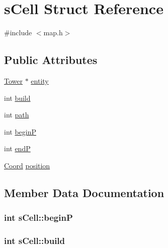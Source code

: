 \hypertarget{structs_cell}{}\section{s\+Cell Struct Reference}
\label{structs_cell}


{\ttfamily \#include $<$map.\+h$>$}

\subsection*{Public Attributes}
\begin{DoxyCompactItemize}
\item 
\hyperlink{tower_8h_a5070e945849fb8f0b9f8e9049b7434ba}{Tower} $\ast$ \hyperlink{structs_cell_a9304c71735ad125198fc7bb3070e7bc4}{entity}
\item 
int \hyperlink{structs_cell_a97b34abb3010bf4ec10aa5f7c6400cef}{build}
\item 
int \hyperlink{structs_cell_a03358119a2ac874f7d85b94d7b651a6c}{path}
\item 
int \hyperlink{structs_cell_a40488db19acb0a9d5ff33882a46a1303}{begin\+P}
\item 
int \hyperlink{structs_cell_a6ec923340fb62915663be3fb0015f3cd}{end\+P}
\item 
\hyperlink{coordonates_8h_aff9d4468ac7a973ce7e5cfb5bd39bc33}{Coord} \hyperlink{structs_cell_a7b1e23f03b64816ca088b2f63082975b}{position}
\end{DoxyCompactItemize}


\subsection{Member Data Documentation}
\hypertarget{structs_cell_a40488db19acb0a9d5ff33882a46a1303}{}
\subsubsection[{begin\+P}]{\setlength{\rightskip}{0pt plus 5cm}int s\+Cell\+::begin\+P}\label{structs_cell_a40488db19acb0a9d5ff33882a46a1303}
\hypertarget{structs_cell_a97b34abb3010bf4ec10aa5f7c6400cef}{}
\subsubsection[{build}]{\setlength{\rightskip}{0pt plus 5cm}int s\+Cell\+::build}\label{structs_cell_a97b34abb3010bf4ec10aa5f7c6400cef}
\hypertarget{structs_cell_a6ec923340fb62915663be3fb0015f3cd}{}

